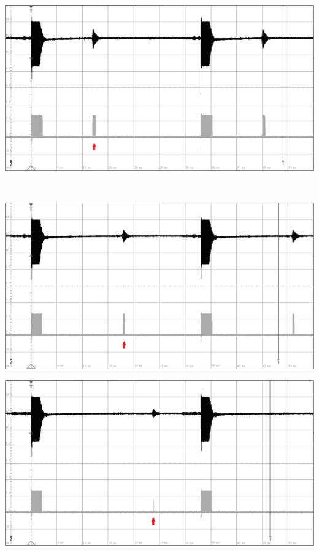 \begin{minipage}{0.46\textwidth}
\includegraphics[width=1\textwidth%
]{Abbildungen/MessungenP2/5V/2mb.PNG}
\label{fig:5v2m}
\end{minipage}\\
\begin{minipage}{0.46\textwidth}
\includegraphics[width=1\textwidth%
]{Abbildungen/MessungenP2/5V/3mb.PNG}
\label{fig:5v3m}
\end{minipage}\qquad
\begin{minipage}{0.46\textwidth}
\includegraphics[width=1\textwidth%
]{Abbildungen/MessungenP2/5V/4mb.PNG}
\label{fig:5v4m}
\end{minipage}\\
